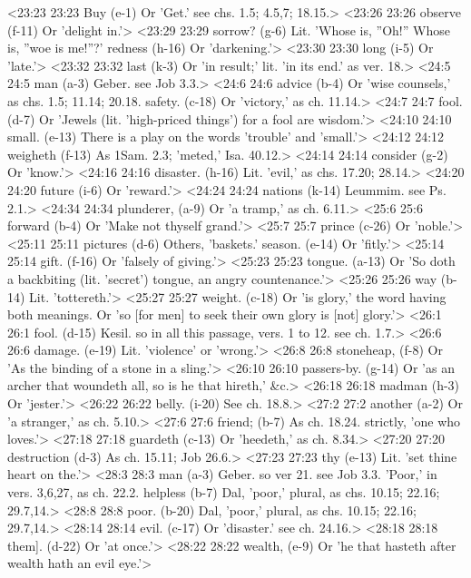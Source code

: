 <23:23 23:23  Buy (e-1)  Or 'Get.' see chs. 1.5; 4.5,7; 18.15.>
<23:26 23:26  observe (f-11)  Or 'delight in.'>
<23:29 23:29  sorrow? (g-6)  Lit. 'Whose is, ''Oh!'' Whose is, ''woe is me!''?'
  redness (h-16)  Or 'darkening.'>
<23:30 23:30  long (i-5)  Or 'late.'>
<23:32 23:32  last (k-3)  Or 'in result;' lit. 'in its end.' as ver. 18.>
<24:5 24:5  man (a-3)  Geber. see Job 3.3.>
<24:6 24:6  advice (b-4)  Or 'wise counsels,' as chs. 1.5; 11.14; 20.18.
  safety. (c-18)  Or 'victory,' as ch. 11.14.>
<24:7 24:7  fool. (d-7)  Or 'Jewels (lit. 'high-priced things') for a fool are  wisdom.'>
<24:10 24:10  small. (e-13)  There is a play on the words 'trouble' and 'small.'>
<24:12 24:12  weigheth (f-13)  As 1Sam. 2.3; 'meted,' Isa. 40.12.>
<24:14 24:14  consider (g-2)  Or 'know.'>
<24:16 24:16  disaster. (h-16)  Lit. 'evil,' as chs. 17.20; 28.14.>
<24:20 24:20  future (i-6)  Or 'reward.'>
<24:24 24:24  nations (k-14)  Leummim. see Ps. 2.1.>
<24:34 24:34  plunderer, (a-9)  Or 'a tramp,' as ch. 6.11.>
<25:6 25:6  forward (b-4)  Or 'Make not thyself grand.'>
<25:7 25:7  prince (c-26)  Or 'noble.'>
<25:11 25:11  pictures (d-6)  Others, 'baskets.'
  season. (e-14)  Or 'fitly.'>
<25:14 25:14  gift. (f-16)  Or 'falsely of giving.'>
<25:23 25:23  tongue. (a-13)  Or 'So doth a backbiting (lit. 'secret') tongue, an angry  countenance.'>
<25:26 25:26  way (b-14)  Lit. 'tottereth.'>
<25:27 25:27  weight. (c-18)  Or 'is glory,' the word having both meanings. Or 'so [for  men] to seek their own glory is [not] glory.'>
<26:1 26:1  fool. (d-15)  Kesil. so in all this passage, vers. 1 to 12. see ch. 1.7.>
<26:6 26:6  damage. (e-19)  Lit. 'violence' or 'wrong.'>
<26:8 26:8  stoneheap, (f-8)  Or 'As the binding of a stone in a sling.'>
<26:10 26:10  passers-by. (g-14)  Or 'as an archer that woundeth all, so is he that hireth,'  &c.>
<26:18 26:18  madman (h-3)  Or 'jester.'>
<26:22 26:22  belly. (i-20)  See ch. 18.8.>
<27:2 27:2  another (a-2)  Or 'a stranger,' as ch. 5.10.>
<27:6 27:6  friend; (b-7)  As ch. 18.24. strictly, 'one who loves.'>
<27:18 27:18  guardeth (c-13)  Or 'heedeth,' as ch. 8.34.>
<27:20 27:20  destruction (d-3)  As ch. 15.11; Job 26.6.>
<27:23 27:23  thy (e-13)  Lit. 'set thine heart on the.'>
<28:3 28:3  man (a-3)  Geber. so ver 21. see Job 3.3. 'Poor,' in vers. 3,6,27, as  ch. 22.2.
  helpless (b-7)  Dal, 'poor,' plural, as chs. 10.15; 22.16; 29.7,14.>
<28:8 28:8  poor. (b-20)  Dal, 'poor,' plural, as chs. 10.15; 22.16; 29.7,14.>
<28:14 28:14  evil. (c-17)  Or 'disaster.' see ch. 24.16.>
<28:18 28:18  them]. (d-22)  Or 'at once.'>
<28:22 28:22  wealth, (e-9)  Or 'he that hasteth after wealth hath an evil eye.'>
